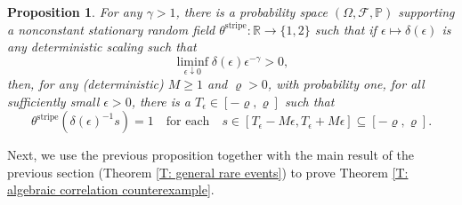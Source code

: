 \documentclass[12pt]{amsart}
\newtheorem{prop}{Proposition}
\begin{document}
	\begin{prop} \label{P: random stripes} For any $\gamma > 1$, there is a probability space $(\Omega,\mathcal{F},\mathbb{P})$ supporting a nonconstant stationary random field $\theta^{\text{stripe}} : \mathbb{R} \to \{1,2\}$ such that if $\epsilon \mapsto \delta(\epsilon)$ is any deterministic scaling such that
		\begin{equation} \label{E: liminf condition}
			\liminf_{\epsilon \downarrow 0} \delta(\epsilon)\epsilon^{-\gamma} > 0,
		\end{equation}
	then, for any (deterministic) $M \geq 1$ and $\varrho > 0$, with probability one, for all sufficiently small $\epsilon > 0$, there is a $T_{\epsilon} \in [- \varrho, \varrho]$ such that 
		\begin{equation} \label{E: long correlations need this}
			\theta^{\text{stripe}}(\delta(\epsilon)^{-1}s) = 1 \quad \text{for each} \quad s \in [T_{\epsilon} - M \epsilon, T_{\epsilon} + M\epsilon] \subseteq [- \varrho,\varrho].
		\end{equation}
	\end{prop}

Next, we use the previous proposition together with the main result of the previous section (Theorem \ref{T: general rare events}) to prove Theorem \ref{T: algebraic correlation counterexample}.
\end{document}

